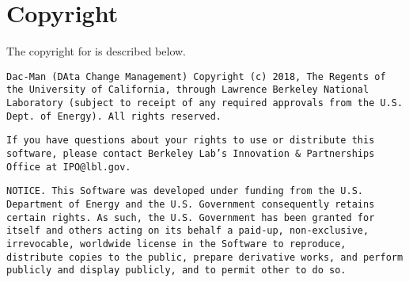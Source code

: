 \section{Copyright}
The copyright for \systemname is described below.\newline

\noindent \texttt{\footnotesize Dac-Man (DAta Change Management)
Copyright (c) 2018, The Regents of the University of California, through Lawrence
Berkeley National Laboratory (subject to receipt of any required approvals
from the U.S. Dept. of Energy). All rights reserved.}\newline

\noindent \texttt{\footnotesize If you have questions about your rights to use or distribute this software,
please contact Berkeley Lab's Innovation \& Partnerships Office at IPO@lbl.gov.}\newline

\noindent \texttt{\footnotesize NOTICE. This Software was developed under funding from the U.S. Department
of Energy and the U.S. Government consequently retains certain rights. As
such, the U.S. Government has been granted for itself and others acting on
its behalf a paid-up, non-exclusive, irrevocable, worldwide license in the
Software to reproduce, distribute copies to the public, prepare derivative
works, and perform publicly and display publicly, and to permit other to do
so.}\newline
